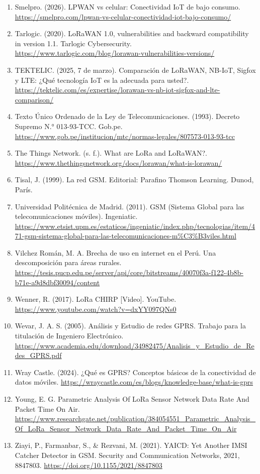 \documentclass[12pt,a4paper]{article}
\begin{document}
\begin{enumerate}
    \item Smelpro. (2026). LPWAN vs celular: Conectividad IoT de bajo consumo. \url{https://smelpro.com/lpwan-vs-celular-conectividad-iot-bajo-consumo/}
    \item Tarlogic. (2020). LoRaWAN 1.0, vulnerabilities and backward compatibility in version 1.1. Tarlogic Cybersecurity. \url{https://www.tarlogic.com/blog/lorawan-vulnerabilities-versions/}
    \item TEKTELIC. (2025, 7 de marzo). Comparación de LoRaWAN, NB-IoT, Sigfox y LTE: ¿Qué tecnología IoT es la adecuada para usted?. \url{https://tektelic.com/es/expertise/lorawan-vs-nb-iot-sigfox-and-lte-comparison/}
    \item Texto Único Ordenado de la Ley de Telecomunicaciones. (1993). Decreto Supremo N.° 013-93-TCC. Gob.pe. \url{https://www.gob.pe/institucion/mtc/normas-legales/807573-013-93-tcc}
    \item The Things Network. (s. f.). What are LoRa and LoRaWAN?. \url{https://www.thethingsnetwork.org/docs/lorawan/what-is-lorawan/}
    \item Tisal, J. (1999). La red GSM. Editorial: Parafino Thomson Learning. Dunod, París.
    \item Universidad Politécnica de Madrid. (2011). GSM (Sistema Global para las telecomunicaciones móviles). Ingeniatic. \url{https://www.etsist.upm.es/estaticos/ingeniatic/index.php/tecnologias/item/471-gsm-sistema-global-para-las-telecomunicaciones-m%C3%B3viles.html}
    \item Vilchez Román, M. A. Brecha de uso en internet en el Perú. Una descomposición para áreas rurales. \url{https://tesis.pucp.edu.pe/server/api/core/bitstreams/40070f3a-f122-4b8b-b71e-a9d8dbf30094/content}
    \item Wenner, R. (2017). LoRa CHIRP [Video]. YouTube. \url{https://www.youtube.com/watch?v=dxYY097QNs0}
    \item Wevar, J. A. S. (2005). Análisis y Estudio de redes GPRS. Trabajo para la titulación de Ingeniero Electrónico. \url{https://www.academia.edu/download/34982475/Analisis_y_Estudio_de_Redes_GPRS.pdf}
    \item Wray Castle. (2024). ¿Qué es GPRS? Conceptos básicos de la conectividad de datos móviles. \url{https://wraycastle.com/es/blogs/knowledge-base/what-is-gprs}
    \item Young, E. G. Parametric Analysis Of LoRa Sensor Network Data Rate And Packet Time On Air. \url{https://www.researchgate.net/publication/384054551_Parametric_Analysis_Of_LoRa_Sensor_Network_Data_Rate_And_Packet_Time_On_Air}
    \item Ziayi, P., Farmanbar, S., \& Rezvani, M. (2021). YAICD: Yet Another IMSI Catcher Detector in GSM. Security and Communication Networks, 2021, 8847803. \url{https://doi.org/10.1155/2021/8847803}
\end{enumerate}
\end{document}
